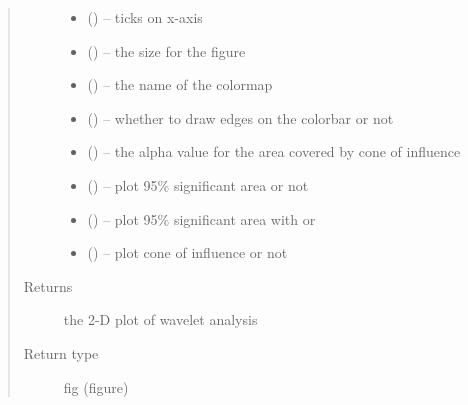 \documentclass[letterpaper,10pt,english]{sphinxmanual}
\begin{document}
\begin{fulllineitems}
\begin{quote}
\begin{description}
\begin{itemize}
\item {} 
 () -- ticks on x-axis

\item {} 
 () -- the size for the figure

\item {} 
 () -- the name of the colormap

\item {} 
 () -- whether to draw edges on the colorbar or not

\item {} 
 () -- the alpha value for the area covered by cone of influence

\item {} 
 () -- plot 95\% significant area or not

\item {} 
 () -- plot 95\% significant area with  or 

\item {} 
 () -- plot cone of influence or not

\end{itemize}

\item[{Returns}] \leavevmode
the 2-D plot of wavelet analysis

\item[{Return type}] \leavevmode
fig (figure)

\end{description}\end{quote}

\end{fulllineitems}

\end{document}
